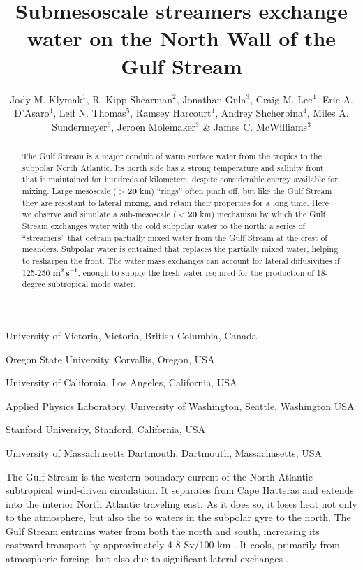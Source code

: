 \documentclass{natureJMK}
\title{Submesoscale streamers exchange water on the North Wall of the Gulf Stream}
\author{Jody M. Klymak$^{1}$, R. Kipp Shearman$^2$, Jonathan Gula$^3$, Craig M. Lee$^4$, Eric A. D'Asaro$^4$, Leif N. Thomas$^5$, Ramsey Harcourt$^4$, Andrey Shcherbina$^4$, Miles A. Sundermeyer$^6$, Jeroen Molemaker$^3$ \& James C. McWilliams$^3$}
\begin{document}
\maketitle

\begin{affiliations}
 \item University of Victoria, Victoria, British Columbia, Canada
 \item Oregon State University, Corvallis, Oregon, USA
 \item University of California, Los Angeles, California, USA 
 \item Applied Physics Laboratory, University of Washington, Seattle, Washington USA
 \item Stanford University, Stanford, California, USA
 \item University of Massachusetts Dartmouth, Dartmouth, Massachusetts, USA
\end{affiliations}

\begin{abstract}
The Gulf Stream is a major conduit of warm surface water from the tropics to the subpolar North Atlantic.  Its north side has a strong  temperature and salinity front that is maintained for hundreds of kilometers, despite considerable energy available for mixing.  Large mesoscale ($\mathbf{>20}$ km) ``rings'' often pinch off, but like the Gulf Stream they are resistant to lateral mixing, and retain their properties for a long time.  Here we observe and simulate a sub-mesoscale ($\mathbf{<20}$ km) mechanism by which the Gulf Stream exchanges water with the cold subpolar water to the north: a series of ``streamers'' that detrain partially mixed water from the Gulf Stream at the crest of meanders. Subpolar water is entrained that replaces the partially mixed water, helping to resharpen the front. The water mass exchanges can account for lateral diffusivities if 125-250 $\mathbf{m^2\,s^{-1}}$, enough to supply the fresh water required for the production of 18-degree subtropical mode water.  
\end{abstract}

The Gulf Stream is the western boundary current of the North Atlantic subtropical wind-driven circulation.  It separates from Cape Hatteras and extends into the interior North Atlantic traveling east.  As it does so, it loses heat not only to  the atmosphere, but also the to waters in the subpolar gyre to the north.  The Gulf Stream entrains water from both the north and south, increasing its eastward transport by approximately 4-8 Sv/100 km \cite{johnsetal95}.    It cools, primarily from atmospheric forcing, but also due to significant lateral exchanges \cite{joyceetal13}.  
\end{document}
